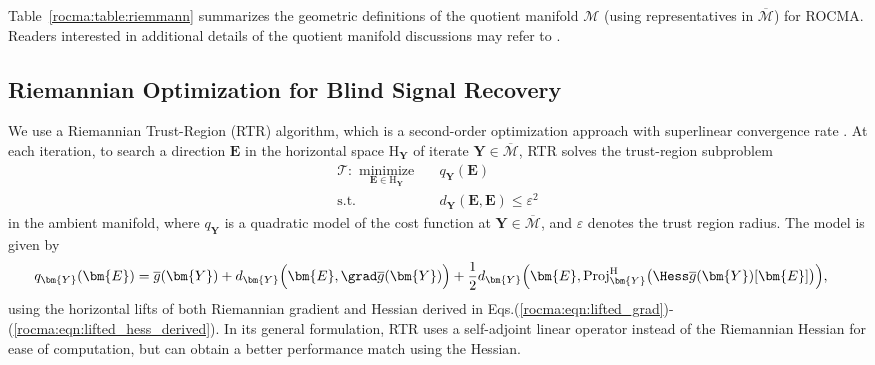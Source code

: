 Table~\ref{rocma:table:riemmann} summarizes the geometric definitions of the quotient manifold $\mathcal{M}$ (using representatives in $\overline{\mathcal{M}}$) for ROCMA. Readers interested in additional details of the quotient manifold discussions may refer to \cite[Chapter 9]{boumal2020intromanifolds}.

\subsection{Riemannian Optimization for Blind Signal Recovery}

We use a Riemannian Trust-Region (RTR) algorithm, which is a second-order optimization approach with superlinear convergence rate \cite{Absil2007trustregions}. At each iteration, to search a direction $\bm{E}$ in the horizontal space $\mathrm{H}_{\bm{Y}}$ of iterate $\bm{Y}\in\overline{\mathcal{M}}$, RTR solves the trust-region subproblem 
\begin{eqnarray}
	\mathcal{T}:\,\,\underset{\bm{E}\in\mathrm{H}_{\bm{Y}}}{\text{minimize}}\quad& q_{\bm{Y}}(\bm{E})\nonumber\\
	\text{s.t.}\quad&d_{\bm{Y}}(\bm{E},\bm{E})\leq\varepsilon^2
\end{eqnarray}
in the ambient manifold, where $q_{\bm{Y}}$ is a quadratic model of the cost function at $\bm{Y}\in\overline{\mathcal{M}}$, and $\varepsilon$ denotes the trust region radius. The model is given by
\begin{align}
	q_{\bm{Y}}(\bm{E})&=\overline{g}(\bm{Y})+d_{\bm{Y}}\Big(\bm{E},\grad \overline{g}(\bm{Y})\Big) 
	+\frac{1}{2}d_{\bm{Y}}\Big(\bm{E},\mathrm{Proj}_{\bm{Y}}^{\mathrm{H}}\big(\Hess \overline{{g}}(\bm{Y})[\bm{E}]\big)\Big),\nonumber
\end{align}
using the horizontal lifts of both Riemannian gradient and Hessian derived in Eqs.(\ref{rocma:eqn:lifted_grad})-(\ref{rocma:eqn:lifted_hess_derived}). In its general formulation, RTR uses a self-adjoint linear operator instead of the Riemannian Hessian for ease of computation, but can obtain a better performance match using the Hessian.

